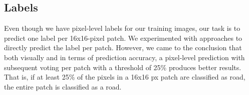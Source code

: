 \subsection{Labels}
Even though we have pixel-level labels for our training images, our task is to predict one label per 16x16-pixel patch. We  experimented with approaches to directly predict the label per patch. However, we came to the conclusion that both visually and in terms of prediction accuracy, a pixel-level prediction with subsequent voting per patch with a threshold of 25\% produces better results.  
That is, if at least 25\% of the pixels in a 16x16 px patch are classified as road, the entire patch is classified as a road.